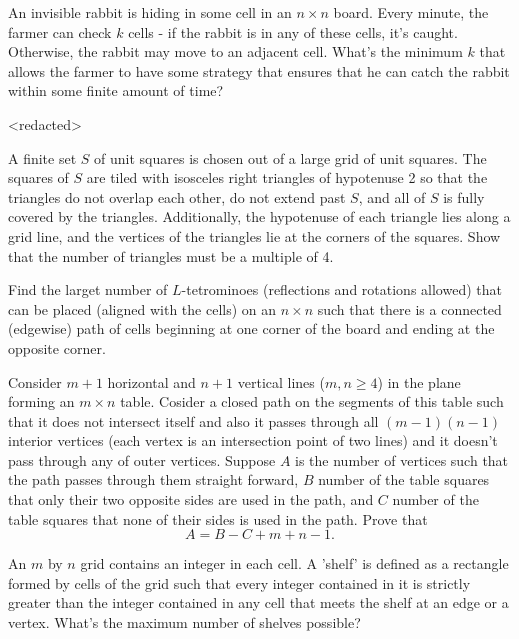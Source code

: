  {An invisible rabbit is hiding in some cell in an $n \times n$ board. Every minute, the farmer can check $k$ cells - if the rabbit is in any of these cells, it's caught. Otherwise, the rabbit may move to an adjacent cell. What's the minimum $k$ that allows the farmer to have some strategy that ensures that he can catch the rabbit within some finite amount of time?}



 {<redacted>}

 {A finite set $S$ of unit squares is chosen out of a large grid of unit squares. The squares of $S$ are tiled with isosceles right triangles of hypotenuse 2 so that the triangles do not overlap each other, do not extend past $S$, and all of $S$ is fully covered by the triangles. Additionally, the hypotenuse of each triangle lies along a grid line, and the vertices of the triangles lie at the corners of the squares. Show that the number of triangles must be a multiple of 4.}

 {Find the larget number of $L$-tetrominoes (reflections and rotations allowed) that can be placed (aligned with the cells) on an $n \times n$ such that there is a connected (edgewise) path of cells beginning at one corner of the board and ending at the opposite corner.}

 {Consider $m+1$ horizontal and $n+1$ vertical lines ($m,n\ge 4$) in the plane forming an $m\times n$ table. Cosider a closed path on the segments of this table such that it does not intersect itself and also it passes through all $(m-1)(n-1)$ interior vertices (each vertex is an intersection point of two lines) and it doesn't pass through any of outer vertices. Suppose $A$ is the number of vertices such that the path passes through them straight forward, $B$ number of the table squares that only their two opposite sides are used in the path, and $C$ number of the table squares that none of their sides is used in the path. Prove that
$$A=B-C+m+n-1.$$}



 {An $m$ by $n$ grid contains an integer in each cell. A 'shelf' is defined as a rectangle formed by cells of the grid such that every integer contained in it is strictly greater than the integer contained in any cell that meets the shelf at an edge or a vertex. What's the maximum number of shelves possible?}


